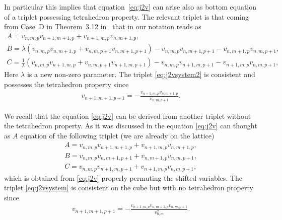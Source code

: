 \documentclass[pdftex]{sigma}
\numberwithin{equation}{section}
\begin{document}
In particular this implies that equation~\eqref{eq:j2v} can arise also as bottom equation of a triplet possessing tetrahedron property.
The relevant triplet is that coming from Case~D in Theorem~3.12 in~\cite{Boll2012b} that in our notation reads as
\begin{subequations} \label{eq:j2vsystem2}
 \begin{gather}
 A = v_{n,m,p}v_{n+1,m+1,p}+v_{n+1,m,p}v_{n,m+1,p}, \label{eq:j2vAeq2} \\
 B =\lambda(v_{n,m,p} v_{n,m+1,p}+v_{n,m,p+1} v_{n,m+1,p+1})
 -v_{n,m,p} v_{n,m+1,p+1}-v_{n,m+1,p} v_{n,m,p+1}, \label{eq:j2vBeq2} \\
 C=\frac{1}{\lambda} ( v_{n,m,p} v_{n+1,m,p}+v_{n,m,p+1} v_{n+1,m,p+1} )
 -v_{n,m,p} v_{n+1,m,p+1}-v_{n+1,m,p} v_{n,m,p+1}, \!\!\!\!\label{eq:j2vCeq2}
 \end{gather}
\end{subequations}
Here $\lambda$ is a new non-zero parameter. The triplet \eqref{eq:j2vsystem2} is consistent and possesses the tetrahedron property since
\begin{gather*}
 v_{n+1,m+1,p+1} = -\frac{v_{n+1,m,p} v_{n,m+1,p}}{v_{n,m,p+1}}. %
\end{gather*}

\begin{Remark} We recall that the equation \eqref{eq:j2v} can be derived from another  triplet without the tetrahedron property.  As it was discussed in \cite{Hietarinta2004,Hietarinta2005} the  equation \eqref{eq:j2v} can  thought as $A$ equation of the  following triplet (we are already on the lattice)
 \begin{subequations}\label{eq:j2vsystem}
 \begin{gather}
 A= v_{n,m,p}v_{n+1,m+1,p}+v_{n+1,m,p}v_{n,m+1,p}, \label{eq:j2vAeq} \\
 B= v_{n,m,p}v_{n,m+1,p+1}+v_{n,m+1,p}v_{n,m,p+1}, \label{eq:j2vBeq} \\
 C= v_{n,m,p}v_{n+1,m,p+1}+v_{n+1,m,p}v_{n,m,p+1}, \label{eq:j2vCeq}
 \end{gather}
 \end{subequations}
 which is obtained from \eqref{eq:j2v} properly permuting the shifted variables. The triplet \eqref{eq:j2vsystem} is consistent on the cube
 but with no tetrahedron property since
 \begin{gather*}
 v_{n+1,m+1,p+1} = -\frac{v_{n+1,m,p} v_{n,m+1,p} v_{n,m,p+1}}{v_{n,m}^2}. %
 \end{gather*}
\end{Remark}
\end{document}
